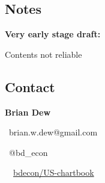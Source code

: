 \documentclass{report}
\begin{document}
\hspace{6mm} \begin{minipage}{0.36\textwidth}
\subsection*{ {\color{red} \faExclamationTriangle} \color{black!70} {\seriffont Notes}}

{\color{red} \textbf{Very early stage draft:}} 

Contents not reliable 



\subsection*{{\color{gray} \faUser} \color{black!70} {\seriffont Contact}}

\textbf{Brian Dew} \ 

{\color{gray} \faEnvelope} \ brian.w.dew@gmail.com \ 

{\color{gray} \faTwitter} \ @bd\_econ \

{\color{gray} \faGithub} \ \ \href{https://github.com/bdecon/US-chartbook}{bdecon/US-chartbook}

\vfill
\end{minipage}



\newpage





\end{document}
